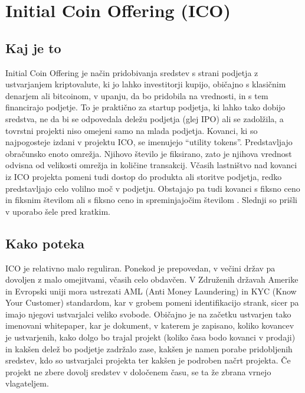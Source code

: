 \documentclass[letterpaper, titlepage, freqn]{article}
\begin{document}
\section{Initial Coin Offering (ICO)}

\subsection{ Kaj je to}

Initial Coin Offering je način pridobivanja sredstev s strani podjetja z ustvarjanjem kriptovalute, ki jo lahko investitorji kupijo, običajno s klasičnim denarjem ali bitcoinom, v upanju, da bo pridobila na vrednosti, in s tem financirajo podjetje. To je praktično za startup podjetja, ki lahko tako dobijo sredstva, ne da bi se odpovedala deležu podjetja (glej IPO) ali se zadolžila, a tovrstni projekti niso omejeni samo na mlada podjetja. Kovanci, ki so najpogosteje izdani v projektu ICO, se imenujejo “utility tokens”. Predstavljajo obračunsko enoto omrežja. Njihovo število je fiksirano, zato je njihova vrednost odvisna od velikosti omrežja in količine transakcij. Včasih lastništvo nad kovanci iz ICO projekta pomeni tudi dostop do produkta ali storitve podjetja, redko predstavljajo celo volilno moč v podjetju. Obstajajo pa tudi kovanci s fiksno ceno in fiksnim številom ali s fiksno ceno in spreminjajočim številom . Slednji so prišli v uporabo šele pred kratkim.\\

\subsection{Kako poteka}

ICO je relativno malo reguliran. Ponekod je prepovedan, v večini držav pa dovoljen z malo omejitvami, včasih celo obdavčen. V Združenih državah Amerike in Evropski uniji mora ustrezati AML (Anti Money Laundering) in KYC (Know Your Customer) standardom, kar v grobem pomeni identifikacijo strank, sicer pa imajo njegovi ustvarjalci veliko svobode. Običajno je na začetku ustvarjen tako imenovani whitepaper, kar je dokument, v katerem je zapisano, koliko kovancev je ustvarjenih, kako dolgo bo trajal projekt (koliko časa bodo kovanci v prodaji) in kakšen delež bo podjetje zadržalo zase, kakšen je namen porabe pridobljenih sredstev, kdo so ustvarjalci projekta ter kakšen je podroben načrt projekta. Če projekt ne zbere dovolj sredstev v določenem času, se ta že zbrana vrnejo vlagateljem.\\
\end{document}

